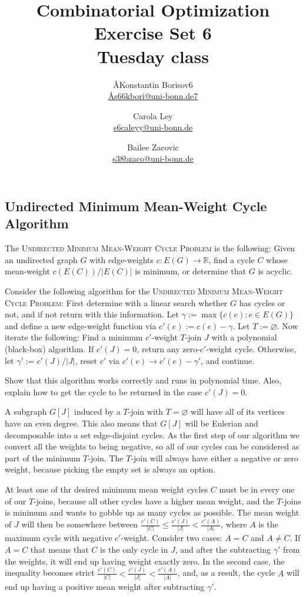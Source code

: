 \documentclass{article}
\title{Combinatorial Optimization \\ Exercise Set 6 \\ Tuesday class}
\author{
  \AA{Konstantin Borisov}{6} \\
  \href{mailto:\AA{s66kbori@uni-bonn.de}{7}}{\AA{s66kbori@uni-bonn.de}{7}}
  \and
  Carola Ley \\
  \href{mailto:s6caleyy@uni-bonn.de}{s6caleyy@uni-bonn.de}
  \and
  Bailee Zacovic \\
  \href{mailto:s38bzaco@uni-bonn.de}{s38bzaco@uni-bonn.de}
}
\let\emptyset\varnothing
\newcommand{\R}{\mathbb{R}}
\begin{document}
  \maketitle

  \setcounter{section}{6}
  \subsection{Undirected Minimum Mean-Weight Cycle Algorithm}
  \begin{centerframebox}
    The \textsc{Undirected Minimum Mean-Weight Cycle Problem}
    is the following: Given an undirected graph $G$ with edge-weights $c : E(G) \to \R$,
    find a cycle $C$ whose mean-weight $c(E(C))/|E(C)|$ is minimum, or determine that
    $G$ is acyclic.

    Consider the following algorithm for the \textsc{Undirected Minimum Mean-Weight Cycle Problem}:
    First determine with a linear search whether $G$ has cycles or not, and if not return with this information.
    Let $\gamma := \max\{c(e) : e \in E(G)\}$ and define a new edge-weight function via $c'(e) := c(e) - \gamma$.
    Let $T := \emptyset$.
    Now iterate the following: Find a minimum $c'$-weight $T$-join $J$ with a polynomial (black-box) algorithm.
    If $c'(J) = 0$, return any zero-$c'$-weight cycle.
    Otherwise, let $\gamma':= c'(J)/|J|$, reset $c'$ via $c'(e) \rightarrow c'(e) - \gamma'$, and continue.

    Show that this algorithm works correctly and runs in polynomial time.
    Also, explain how to get the cycle to be returned in the case $c'(J) = 0$.
  \end{centerframebox}
  A subgraph $G[J]$ induced by a $T$-join with $T = \emptyset$ will have all of its vertices have an even degree.
  This also means that $G[J]$ will be Eulerian and decomposable into a set edge-disjoint cycles.
  As the first step of our algorithm we convert all the weights to being negative,
  so all of our cycles can be considered as part of the minimum $T$-join.
  The $T$-join will always have either a negative or zero weight, because picking the empty set is always an option.

  At least one of thr desired minimum mean weight cycles $C$ must be in every one of our $T$-joins,
  because all other cycles have a higher mean weight, and the $T$-joins is minimum and wants to gobble up as many cycles as possible.
  The mean weight of $J$ will then be somewhere between $\frac{c'(C)}{|C|} \leq \frac{c'(J)}{|J|} < \frac{c'(A)}{|A|}$,
  where $A$ is the maximum cycle with negative $c'$-weight.
  Consider two cases: $A = C$ and $A \neq C$. If $A = C$ that means that $C$ is the only cycle in $J$,
  and after the subtracting $\gamma'$ from the weights, it will end up having weight exactly zero.
  In the second case, the inequality becomes strict $\frac{c'(C)}{|C|} < \frac{c'(J)}{|J|} < \frac{c'(A)}{|A|}$,
  and, as a result, the cycle $A$ will end up having a positive mean weight after subtracting $\gamma'$.
\end{document}

